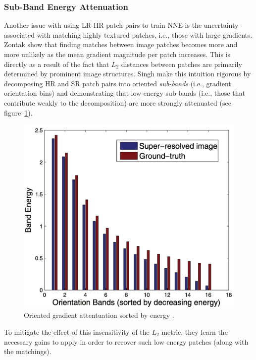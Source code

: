 \subsubsection{Sub-Band Energy Attenuation}\label{subsubsec:subband}
Another issue with using LR-HR patch pairs to train NNE is the uncertainty associated with matching highly textured patches, i.e., those with large gradients.
%
Zontak \etal \cite{zontak2011internal} show that finding matches between image patches becomes more and more unlikely as the mean gradient magnitude per patch increases.
%
This is directly as a result of the fact that \(L_2\) distances between patches are primarily determined by prominent image structures.
%
Singh \etal \cite{singh2014} make this intuition rigorous by decomposing HR and SR patch pairs into oriented \textit{sub-bands} (i.e., gradient orientation bins) and demonstrating that low-energy sub-bands (i.e., those that contribute weakly to the decomposition) are more strongly attenuated (see figure~\ref{fig:subbands}).
\begin{figure}
    \centering
    \begin{adjustbox}{width=\linewidth}
        \centering
        \includegraphics{figures/classical/subbands.png}
    \end{adjustbox}
    \caption{Oriented gradient attentuation sorted by energy \cite{singh2014}.}\label{fig:subbands}
\end{figure}
To mitigate the effect of this insensitivity of the \(L_2\) metric, they learn the necessary gains to apply in order to recover such low energy patches (along with the matchings).

